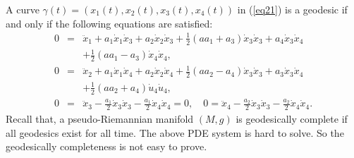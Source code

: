 \documentclass[reqno, 12pt]{amsart}
\numberwithin{equation}{section}
\begin{document}
A curve $\gamma(t) = (x_1(t), x_2(t), x_3(t), x_4(t))$ in (\ref{eq21}) 
is a geodesic if and only if the following equations are satisfied:
\begin{eqnarray*}
0 &=& \ddot{x}_1 + a_1\dot{x}_1\dot{x}_3 + a_2\dot{x}_2\dot{x}_3
+\frac{1}{2} (aa_1 + a_3)\dot{x}_3\dot{x}_3 + a_4\dot{x}_3\dot{x}_4\\
&& + \frac{1}{2}(aa_1 - a_3)\dot{x}_4\dot{x}_4,\\
0 &=& \ddot{x}_2 + a_1\dot{x}_1\dot{x}_4 + a_2\dot{x}_2\dot{x}_4
+ \frac{1}{2}(aa_2  - a_4)\dot{x}_3\dot{x}_3 + a_3\dot{x}_3\dot{x}_4\\
&& + \frac{1}{2}(aa_2 + a_4)\dot{u}_4\dot{u}_4,\\
0 &=& \ddot{x}_3 - \frac{a_1}{2}\dot{x}_3\dot{x}_3  
- \frac{a_1}{2}\dot{x}_4\dot{x}_4 = 0,\quad
0 = \ddot{x}_4 - \frac{a_2}{2}\dot{x}_3\dot{x}_3 
- \frac{a_2}{2}\dot{x}_4\dot{x}_4.
\end{eqnarray*}
Recall that, a pseudo-Riemannian manifold $(M,g)$ is geodesically complete  if all geodesics exist for all time. The above PDE system is
hard to solve. So the geodesically completeness is not easy to prove.\\
\end{document}
